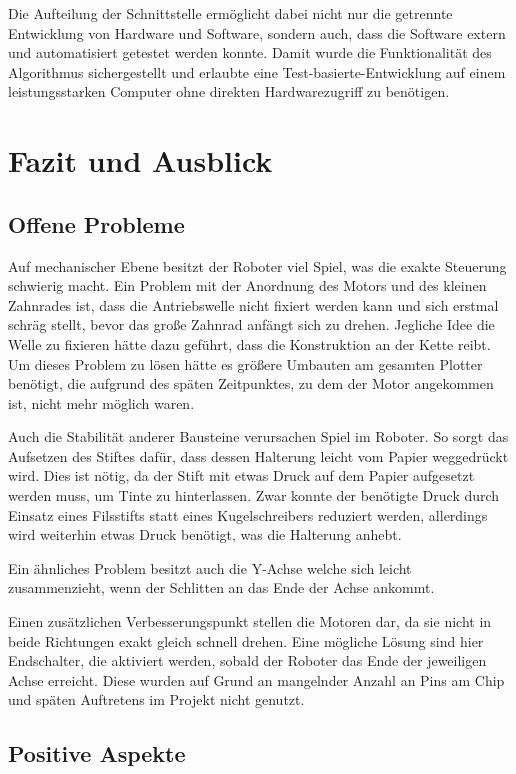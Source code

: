 \documentclass[conference,compsoc,final,a4paper]{IEEEtran}
\begin{document}
Die Aufteilung der Schnittstelle ermöglicht dabei nicht nur die getrennte Entwicklung von Hardware und Software,
sondern auch, dass die Software extern und automatisiert getestet werden konnte. Damit wurde die Funktionalität des Algorithmus
sichergestellt und erlaubte eine Test-basierte-Entwicklung auf einem leistungsstarken Computer ohne direkten
Hardwarezugriff zu benötigen.

\section{Fazit und Ausblick}

\subsection{Offene Probleme}

Auf mechanischer Ebene besitzt der Roboter viel Spiel, was die exakte Steuerung schwierig macht. Ein Problem mit der Anordnung
des Motors und des kleinen Zahnrades ist, dass die
Antriebswelle nicht fixiert werden kann und sich erstmal schräg stellt, bevor das große Zahnrad anfängt sich zu drehen. Jegliche
Idee die Welle zu fixieren hätte dazu geführt, dass die Konstruktion an der Kette reibt. Um dieses Problem zu lösen hätte es größere
Umbauten am gesamten Plotter benötigt, die aufgrund des späten Zeitpunktes, zu dem der Motor angekommen ist, nicht mehr möglich waren.

Auch die Stabilität anderer Bausteine verursachen Spiel im Roboter. So sorgt das Aufsetzen des Stiftes dafür, dass dessen Halterung
leicht vom Papier weggedrückt wird. Dies ist nötig, da der Stift mit etwas Druck auf dem Papier aufgesetzt werden muss, um
Tinte zu hinterlassen. Zwar konnte der benötigte Druck durch Einsatz eines Filsstifts statt eines Kugelschreibers reduziert werden,
allerdings wird weiterhin etwas Druck benötigt, was die Halterung anhebt.

Ein ähnliches Problem besitzt auch die Y-Achse welche sich leicht zusammenzieht, wenn der Schlitten an das Ende der Achse ankommt.

Einen zusätzlichen Verbesserungspunkt stellen die Motoren dar, da sie nicht in beide Richtungen exakt gleich schnell drehen. Eine
mögliche Lösung sind hier Endschalter, die aktiviert werden, sobald der Roboter das Ende der jeweiligen Achse erreicht. Diese wurden
auf Grund an mangelnder Anzahl an Pins am Chip und späten Auftretens im Projekt nicht genutzt.

\subsection{Positive Aspekte}
\end{document}
